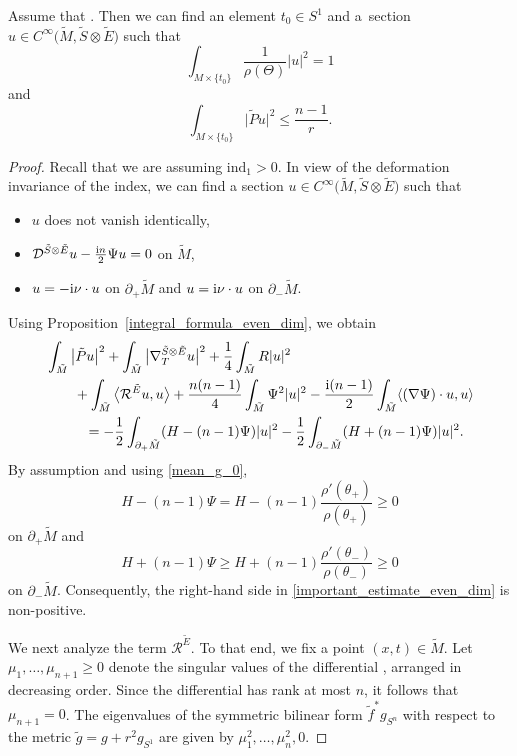 \begin{Proposition}
\label{existence_of_spinor_even_dim}
Assume that . Then we can find an element $t_0 \in S^1$ and a~section $u \in C^\infty\big(\tilde{M},\tilde{S} \otimes \tilde{E}\big)$ such that
\[\int_{M \times \{t_0\}} \frac{1}{\rho(\Theta)} |u|^2 = 1\]
and
\[\int_{M \times \{t_0\}} \big|\tilde{P} u\big|^2 \leq \frac{n-1}{r}.\]
\end{Proposition}

\begin{proof}
Recall that we are assuming $\mathrm{ind}_1 > 0$. In view of the deformation invariance of the index, we can find a section $u \in C^\infty\big(\tilde{M},\tilde{S} \otimes \tilde{E}\big)$ such that
\begin{itemize}\itemsep=0pt
 \item $u$ does not vanish identically,
 \item $\mathcal{D}^{\tilde{S} \otimes \tilde{E}} u - \frac{{\rm i}n}{2} \Psi u = 0$ on $\tilde{M}$,
 \item $u = -{\rm i} \nu \cdot u$ on $\partial_+ \tilde{M}$ and $u = {\rm i} \nu \cdot u$ on $\partial_- \tilde{M}$.
\end{itemize}
Using Proposition~\ref{integral_formula_even_dim}, we obtain
\begin{align}
&\int_{\tilde{M}} \big|\tilde{P} u\big|^2 + \int_{\tilde{M}} \big|\nabla_T^{\tilde{S} \otimes \tilde{E}} u\big|^2 + \frac{1}{4} \int_{\tilde{M}} R |u|^2\nonumber \\
&\qquad{}+ \int_{\tilde{M}} \big\langle \mathcal{R}^{\tilde{E}} u,u \big\rangle + \frac{n(n-1)}{4} \int_{\tilde{M}} \Psi^2 |u|^2 - \frac{{\rm i}(n-1)}{2} \int_{\tilde{M}} \langle (\nabla \Psi) \cdot u,u \rangle \nonumber\\
&\phantom{\qquad+}{}= -\frac{1}{2} \int_{\partial_+ \tilde{M}} (H-(n-1)\Psi) |u|^2 - \frac{1}{2} \int_{\partial_- \tilde{M}} (H+(n-1)\Psi) |u|^2.\label{important_estimate_even_dim}
\end{align}
By assumption and using \eqref{mean_g_0}, \[H-(n-1)\Psi = H-(n-1) \frac{\rho'(\theta_+)}{\rho(\theta_+)} \geq 0\] on $\partial_+ \tilde{M}$ and \[H +(n-1)\Psi \geq H+(n-1) \frac{\rho'(\theta_-)}{\rho(\theta_-)} \geq 0\] on $\partial_- \tilde{M}$. Consequently, the right-hand side in \eqref{important_estimate_even_dim} is non-positive.

We next analyze the term $\mathcal{R}^{\tilde{E}}$. To that end, we fix a point $(x,t) \in \tilde{M}$. Let $ \mu_1,\hdots,\mu_{n+1} \geq 0$ denote the singular values of the differential , arranged in decreasing order. Since the differential  has rank at most $n$, it follows that $\mu_{n+1} = 0$.
The eigenvalues of the symmetric bilinear form $\tilde{f}^* g_{S^n}$ with respect to the metric $\tilde{g} = g + r^2 g_{S^1}$ are given by $\mu_1^2,\hdots,\mu_n^2,0$.


\end{proof}
